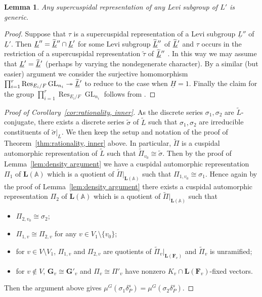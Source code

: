 \documentclass[a4paper]{amsart}
\numberwithin{equation}{section}
\newtheorem{lem}[thm]{Lemma}
\theoremstyle{remark}
\theoremstyle{definition}
\DeclareMathOperator{\Res}{Res}
\DeclareMathOperator{\GL}{GL}
\newcommand{\alggrp}[1]{\underline{#1}}
\newcommand{\glob}[1]{\boldsymbol{#1}}
\newcommand{\onto}{\twoheadrightarrow}
\renewcommand{\simeq}{\cong}
\newcommand{\lowprime}[1][\prime]{
  \mathchoice
    {\raisebox{-0.7ex}{$\scriptstyle #1$}}
    {\raisebox{-0.7ex}{$\scriptstyle #1$}}
    {\raisebox{-0.7ex}{$\scriptstyle #1$}}
    {\raisebox{-0.3ex}{$\scriptscriptstyle #1$}}
}
\begin{document}
\begin{lem}\label{lem:levi-generic}
  Any supercuspidal representation of any Levi subgroup of $L'$ is generic.
\end{lem}

\begin{proof}
  Suppose that $\tau$ is a supercuspidal representation of a Levi subgroup $\alggrp{L}''$ of $\alggrp{L}'$.
  Then $\alggrp{L}'' = \widetilde{\alggrp{L}}^{\lowprime[\prime\prime]} \cap \alggrp{L}'$ for some Levi subgroup $\widetilde{\alggrp{L}}^{\lowprime[\prime\prime]}$ of $\widetilde{\alggrp{L}}^{\lowprime}$ and $\tau$ occurs in the restriction
  of a supercuspidal representation $\widetilde\tau$ of $\widetilde{\alggrp{L}}^{\lowprime[\prime\prime]}$ \cite[\S2]{MR1141803}.
  In this way we may assume that $\alggrp{L}' = \widetilde{\alggrp{L}}^{\lowprime}$ (perhaps by varying the nondegenerate character).
  By a similar (but easier) argument we consider the surjective homomorphism $\prod_{i=1}^r \Res_{E_i/F}\GL_{n_i} \onto \widetilde{\alggrp{L}}^{\lowprime}$ to reduce to the case when $\alggrp{H} = 1$.
  Finally the claim for the group $\prod_{i=1}^r \Res_{E_i/F}\GL_{n_i}$ follows from \cite[4.4 Theorem]{MR0579172}.
\end{proof}

\begin{proof}[Proof of Corollary~\ref{cor:rationality, inner}]
  As the discrete series $\sigma_{1},\sigma_{2}$ are $\widetilde L$-conjugate, there exists a discrete series $\widetilde{\sigma}$ of $\widetilde{L}$ such that $\sigma_{1},\sigma_{2}$ are irreducible constituents of $\widetilde{\sigma}|_L$.
  We then keep the setup and notation of the proof of Theorem~\ref{thm:rationality, inner} above.
  In particular, $\widetilde{\Pi}$ is a cuspidal automorphic representation of $\widetilde{L}$ such that $\widetilde{\Pi}_{v_{0}} \cong \widetilde{\sigma}$.
  Then by the proof of Lemma~\ref{lem:density argument} we have a cuspidal automorphic representation $\Pi_{1}$ of $\glob{L}(\mathbb{A})$ which is a quotient of $\widetilde{\Pi}|_{\glob{L}(\mathbb{A})}$ such that $\Pi_{1,v_{0}}\simeq \sigma_{1}$.
  Hence again by the proof of Lemma~\ref{lem:density argument} there exists a cuspidal automorphic representation $\Pi_{2}$ of $\glob{L}(\mathbb{A})$ which is a quotient of $\widetilde{\Pi}|_{\glob{L}(\mathbb{A})}$   such that
  \begin{itemize}
  \item $\Pi_{2,v_{0}}\simeq \sigma_{2}$;
  \item $\Pi_{1,v}\simeq \Pi_{2,v}$ for any $v\in V_1\setminus \{v_{0}\}$;
  \item for $v\in V\setminus V_1$, $\Pi_{1,v}$ and $\Pi_{2,v}$ are quotients of $\widetilde{\Pi}_{v}|_{\glob{L}(\glob{F}_v)}$ and $\widetilde{\Pi}_{v}$ is unramified;
  \item for $v\notin V$, $\glob{G}_{v}\simeq \glob{G}'_{v}$ and $\Pi_{v}\simeq \Pi'_{v}$ have nonzero $K_{v}\cap \glob{L}(\glob{F}_{v})$-fixed vectors.
  \end{itemize}
  Then the argument above gives $\mu^{G}(\sigma_{1}\delta_{P}^{s}) = \mu^{G}(\sigma_{2}\delta_{P}^{s})$.
\end{proof}
\end{document}
